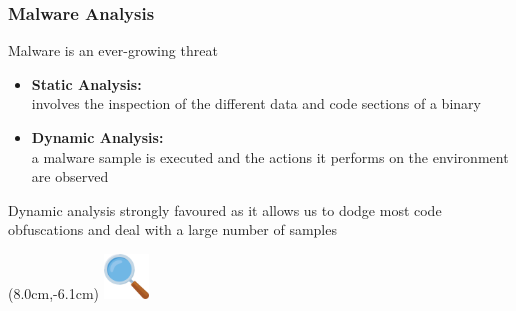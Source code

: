 \documentclass[compress]{beamer}
\begin{document}

\begin{frame}
    \frametitle{Malware Analysis}

	Malware is an ever-growing threat
	
    \medskip
    \begin{itemize}
        \item \textcolor{sapienza}{\textbf{Static Analysis:}}\\
        involves the inspection of the different data and code sections of a binary
        \item \textcolor{sapienza}{\textbf{Dynamic Analysis:}}\\
        a malware sample is executed and the actions it performs on the environment are observed
    \end{itemize}
    \vspace{0.5cm}    
        
         \begin{beamerboxesrounded}[shadow=true]{}
    Dynamic analysis strongly favoured as it allows us to dodge most code obfuscations and deal with a large number of samples
    \end{beamerboxesrounded}    

    \begin{textblock*}{2cm}(8.0cm,-6.1cm)
   \includegraphics[width=1.2cm]{image/search.png}%
	\end{textblock*} 

\end{frame}
\end{document}
